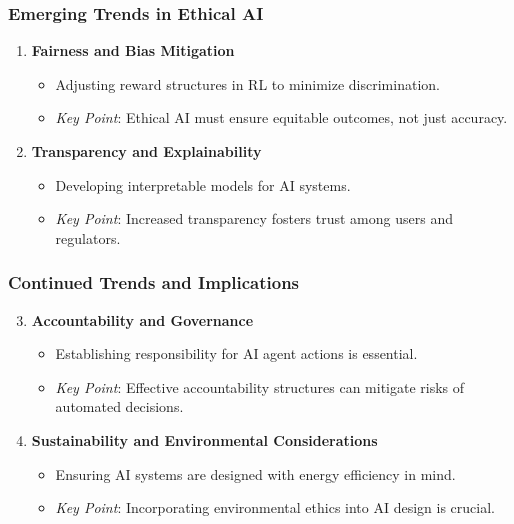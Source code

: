 \documentclass[aspectratio=169]{beamer}
\begin{document}
\begin{frame}[fragile]
    \frametitle{Emerging Trends in Ethical AI}
    \begin{enumerate}
        \item \textbf{Fairness and Bias Mitigation}
            \begin{itemize}
                \item Adjusting reward structures in RL to minimize discrimination.
                \item \textit{Key Point}: Ethical AI must ensure equitable outcomes, not just accuracy.
            \end{itemize}
        \item \textbf{Transparency and Explainability}
            \begin{itemize}
                \item Developing interpretable models for AI systems.
                \item \textit{Key Point}: Increased transparency fosters trust among users and regulators.
            \end{itemize}
    \end{enumerate}
\end{frame}

\begin{frame}[fragile]
    \frametitle{Continued Trends and Implications}
    \begin{enumerate}
        \setcounter{enumi}{2} %
        \item \textbf{Accountability and Governance}
            \begin{itemize}
                \item Establishing responsibility for AI agent actions is essential.
                \item \textit{Key Point}: Effective accountability structures can mitigate risks of automated decisions.
            \end{itemize}
        \item \textbf{Sustainability and Environmental Considerations}
            \begin{itemize}
                \item Ensuring AI systems are designed with energy efficiency in mind.
                \item \textit{Key Point}: Incorporating environmental ethics into AI design is crucial.
            \end{itemize}
    \end{enumerate}
\end{frame}
\end{document}
